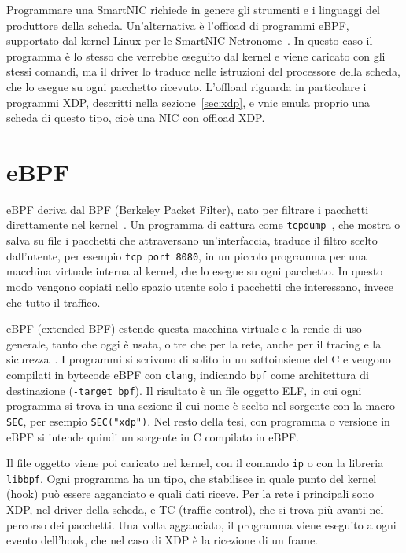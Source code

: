Programmare una SmartNIC richiede in genere gli strumenti e i linguaggi del produttore della scheda. Un'alternativa è l'offload di programmi eBPF, supportato dal kernel Linux per le SmartNIC Netronome~\cite{cilium-bpf}. In questo caso il programma è lo stesso che verrebbe eseguito dal kernel e viene caricato con gli stessi comandi, ma il driver lo traduce nelle istruzioni del processore della scheda, che lo esegue su ogni pacchetto ricevuto. L'offload riguarda in particolare i programmi XDP, descritti nella sezione~\ref{sec:xdp}, e vnic emula proprio una scheda di questo tipo, cioè una NIC con offload XDP.

\section{eBPF}\label{sec:ebpf}

eBPF deriva dal BPF (Berkeley Packet Filter), nato per filtrare i pacchetti direttamente nel kernel~\cite{kernel-bpf-filter}. Un programma di cattura come \texttt{tcpdump}~\cite{tcpdump}, che mostra o salva su file i pacchetti che attraversano un'interfaccia, traduce il filtro scelto dall'utente, per esempio \texttt{tcp port 8080}, in un piccolo programma per una macchina virtuale interna al kernel, che lo esegue su ogni pacchetto. In questo modo vengono copiati nello spazio utente solo i pacchetti che interessano, invece che tutto il traffico.

eBPF (extended BPF) estende questa macchina virtuale e la rende di uso generale, tanto che oggi è usata, oltre che per la rete, anche per il tracing e la sicurezza~\cite{ebpf-io}. I programmi si scrivono di solito in un sottoinsieme del C e vengono compilati in bytecode eBPF con \texttt{clang}, indicando \texttt{bpf} come architettura di destinazione (\texttt{-target bpf}). Il risultato è un file oggetto ELF, in cui ogni programma si trova in una sezione il cui nome è scelto nel sorgente con la macro \texttt{SEC}, per esempio \texttt{SEC("xdp")}. Nel resto della tesi, con programma o versione in eBPF si intende quindi un sorgente in C compilato in eBPF.

Il file oggetto viene poi caricato nel kernel, con il comando \texttt{ip} o con la libreria \texttt{libbpf}. Ogni programma ha un tipo, che stabilisce in quale punto del kernel (hook) può essere agganciato e quali dati riceve. Per la rete i principali sono XDP, nel driver della scheda, e TC (traffic control), che si trova più avanti nel percorso dei pacchetti. Una volta agganciato, il programma viene eseguito a ogni evento dell'hook, che nel caso di XDP è la ricezione di un frame.

